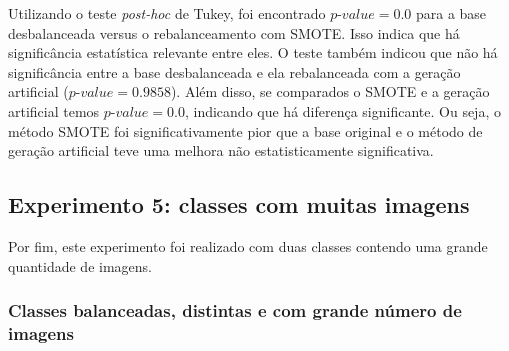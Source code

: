 Utilizando o teste \textit{post-hoc} de Tukey, foi encontrado $\textit{p-value} = 0.0$ para a base desbalanceada versus o rebalanceamento com SMOTE. Isso indica que há significância estatística relevante entre eles. O teste também indicou que não há significância entre a base desbalanceada e ela rebalanceada com a geração artificial ($\textit{p-value} = 0.9858$). Além disso, se comparados o SMOTE e a geração artificial temos $\textit{p-value} = 0.0$, indicando que há diferença significante. Ou seja, o método SMOTE foi significativamente pior que a base original e o método de geração artificial teve uma melhora não estatisticamente significativa.

\subsection{Experimento 5: classes com muitas imagens}

Por fim, este experimento foi realizado com duas classes contendo uma grande quantidade de imagens.

\subsubsection{Classes balanceadas, distintas e com grande número de imagens}


